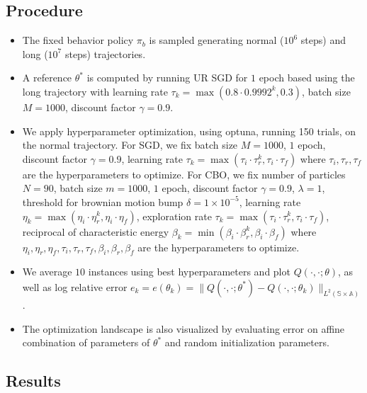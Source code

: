 \documentclass[10.5pt]{article}
\newcommand\bb{\mathbb}
\begin{document}
\subsection{Procedure}
\begin{itemize}
    \item
      The fixed behavior policy $\pi_b$ is sampled generating normal
      ($10^6$ steps) and long ($10^7$ steps) trajectories.
    \item
      A reference $\theta^*$ is computed by running UR SGD for $1$ epoch based using the long trajectory with learning rate $\tau_k=\max(0.8\cdot 0.9992^k, 0.3)$, batch size $M=1000$, discount factor $\gamma=0.9$.
    \item
      We apply hyperparameter optimization, using optuna, running 150 trials, on the normal trajectory. For SGD, we fix batch size $M=1000$, $1$ epoch, discount factor $\gamma=0.9$, learning rate $\tau_k = \max(\tau_i\cdot \tau_r^k, \tau_i\cdot\tau_f)$ where $\tau_i,\tau_r,\tau_f$ are the hyperparameters to optimize. For CBO, we fix number of particles $N=90$, batch size $m=1000$, $1$ epoch, discount factor $\gamma=0.9$, $\lambda=1$, threshold for brownian motion bump $\delta = 1\times 10^{-5}$,  learning rate $\eta_k = \max(\eta_i\cdot \eta_r^k,\eta_i\cdot \eta_f)$,  exploration rate $\tau_k =  \max(\tau_i\cdot \tau_r^k,\tau_i\cdot\tau_f)$, reciprocal of characteristic energy $\beta_k =  \min(\beta_i\cdot \beta_r^k,\beta_i\cdot \beta_f)$ where $\eta_i,\eta_r,\eta_f,\tau_i,\tau_r,\tau_f,\beta_i,\beta_r,\beta_f$ are the hyperparameters to optimize.
    \item
      We average $10$ instances using best hyperparameters and plot $Q(\cdot,\cdot;\theta)$, as well as log relative error
      $e_k=e(\theta_k)=\|Q(\cdot, \cdot;\theta^*)-Q(\cdot, \cdot;\theta_k)\|_{L^2(\bb S\times \bb A)}$.
    \item
      The optimization landscape is also visualized by evaluating error on affine combination of parameters of $\theta^*$ and random initialization parameters.
 \end{itemize}
\subsection{Results}
\end{document}
